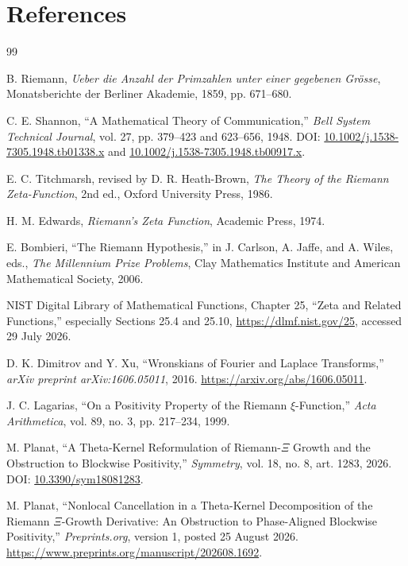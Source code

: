\backmatter
\chapter{References}
\begin{thebibliography}{99}

B. Riemann,
\emph{Ueber die Anzahl der Primzahlen unter einer gegebenen Grösse},
Monatsberichte der Berliner Akademie, 1859, pp. 671--680.

C. E. Shannon,
``A Mathematical Theory of Communication,''
\emph{Bell System Technical Journal}, vol. 27, pp. 379--423 and 623--656, 1948.
DOI: \href{https://doi.org/10.1002/j.1538-7305.1948.tb01338.x}{10.1002/j.1538-7305.1948.tb01338.x} and
\href{https://doi.org/10.1002/j.1538-7305.1948.tb00917.x}{10.1002/j.1538-7305.1948.tb00917.x}.

E. C. Titchmarsh, revised by D. R. Heath-Brown,
\emph{The Theory of the Riemann Zeta-Function}, 2nd ed., Oxford University Press, 1986.

H. M. Edwards,
\emph{Riemann's Zeta Function}, Academic Press, 1974.

E. Bombieri,
``The Riemann Hypothesis,'' in J. Carlson, A. Jaffe, and A. Wiles, eds.,
\emph{The Millennium Prize Problems}, Clay Mathematics Institute and American Mathematical Society, 2006.

NIST Digital Library of Mathematical Functions,
Chapter 25, ``Zeta and Related Functions,'' especially Sections 25.4 and 25.10,
\url{https://dlmf.nist.gov/25}, accessed 29 July 2026.

D. K. Dimitrov and Y. Xu,
``Wronskians of Fourier and Laplace Transforms,''
\emph{arXiv preprint arXiv:1606.05011}, 2016.
\url{https://arxiv.org/abs/1606.05011}.

J. C. Lagarias,
``On a Positivity Property of the Riemann $\xi$-Function,''
\emph{Acta Arithmetica}, vol. 89, no. 3, pp. 217--234, 1999.

M. Planat,
``A Theta-Kernel Reformulation of Riemann-$\Xi$ Growth and the Obstruction to Blockwise Positivity,''
\emph{Symmetry}, vol. 18, no. 8, art. 1283, 2026.
DOI: \href{https://doi.org/10.3390/sym18081283}{10.3390/sym18081283}.

M. Planat,
``Nonlocal Cancellation in a Theta-Kernel Decomposition of the Riemann $\Xi$-Growth Derivative: An Obstruction to Phase-Aligned Blockwise Positivity,''
\emph{Preprints.org}, version 1, posted 25 August 2026.
\url{https://www.preprints.org/manuscript/202608.1692}.


\end{thebibliography}
